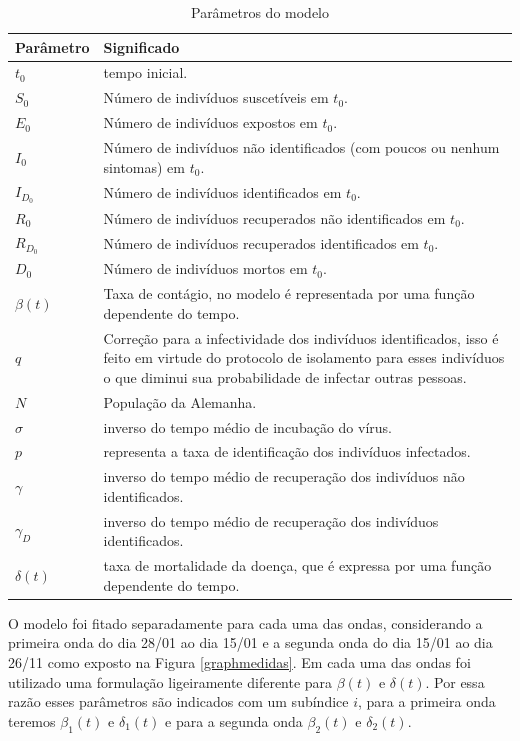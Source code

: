 \documentclass[12pt]{article}
\begin{document}
\begin{table}[h]
\centering
\begin{small}
\caption{Parâmetros do modelo} \label{Tabela1}
\begin{tabular}{|p{2cm}|p{14cm}|}
\hline
            Parâmetro & Significado \\
\hline
$t_0$ & tempo inicial. \\
\hline
$S_0$ & Número de indivíduos suscetíveis em $t_0$.\\
\hline 
$E_0$ & Número de indivíduos expostos em $t_0$.\\
\hline 
$I_0$ & Número de indivíduos não identificados (com poucos ou nenhum sintomas) em $t_0$.\\
\hline 
$I_{D_0}$ & Número de indivíduos identificados em $t_0$.\\
\hline 
$R_0$ & Número de indivíduos recuperados não identificados em $t_0$.\\
\hline 
$R_{D_0}$ & Número de indivíduos recuperados identificados em $t_0$.\\
\hline 
$D_0$ & Número de indivíduos mortos em $t_0$.\\
\hline 
$\beta(t)$ & Taxa de contágio, no modelo é representada por uma função dependente do tempo. \\
\hline
$q$ & Correção para a infectividade dos indivíduos identificados, isso é feito em virtude do protocolo de isolamento para esses indivíduos o que diminui sua probabilidade de infectar outras pessoas.\\
\hline
$N$ & População da Alemanha. \\
\hline
$\sigma$ & inverso do tempo médio de incubação do vírus. \\
\hline
$p$ & representa a taxa de identificação dos indivíduos infectados.\\
\hline
$\gamma$ & inverso do tempo médio de recuperação dos indivíduos não identificados. \\
\hline
$\gamma_D$ & inverso do tempo médio de recuperação dos indivíduos identificados.\\
\hline
$\delta(t)$ & taxa de mortalidade da doença, que é expressa por uma função dependente do tempo. \\
\hline
\end{tabular}
\end{small}
\end{table}



O modelo foi fitado separadamente para cada uma das ondas, considerando a primeira onda do dia 28/01 ao dia 15/01 e a segunda onda do dia 15/01 ao dia 26/11 como exposto na Figura 
\ref{graphmedidas}. Em cada uma das ondas foi utilizado uma formulação ligeiramente diferente para $\beta(t)$ e $\delta(t)$. Por essa razão esses parâmetros são indicados com um subíndice $i$, para a primeira onda teremos $\beta_1(t)$ e $\delta_1(t)$ e para a segunda onda $\beta_2(t)$ e $\delta_2(t)$.
\end{document}
